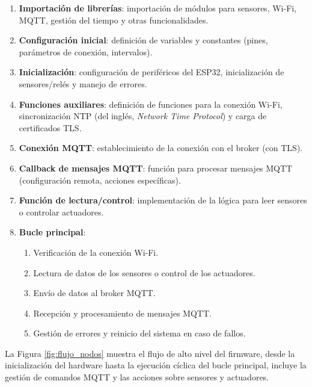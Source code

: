 \begin{enumerate}
    \item \textbf{Importación de librerías}: importación de módulos para sensores,
          Wi-Fi, MQTT, gestión del tiempo y otras funcionalidades.
    \item \textbf{Configuración inicial}: definición de variables y constantes
          (pines, parámetros de conexión, intervalos).
    \item \textbf{Inicialización}: configuración de periféricos del ESP32,
          inicialización de sensores/relés y manejo de errores.
    \item \textbf{Funciones auxiliares}: definición de funciones para la conexión Wi-Fi,
          sincronización NTP (del inglés, \textit{Network Time Protocol}) y carga de
          certificados TLS.
    \item \textbf{Conexión MQTT}: establecimiento de la conexión con el broker (con TLS).
    \item \textbf{Callback de mensajes MQTT}: función para procesar mensajes MQTT
          (configuración remota, acciones específicas).
    \item \textbf{Función de lectura/control}: implementación de la lógica para leer
          sensores o controlar actuadores.
    \item \textbf{Bucle principal}:
          \begin{enumerate}
              \item Verificación de la conexión Wi-Fi.
              \item Lectura de datos de los sensores o control de los actuadores.
              \item Envío de datos al broker MQTT.
              \item Recepción y procesamiento de mensajes MQTT.
              \item Gestión de errores y reinicio del sistema en caso de fallos.
          \end{enumerate}
\end{enumerate}

La Figura \ref{fig:flujo_nodos} muestra el flujo de alto nivel del firmware,
desde la inicialización del hardware hasta la ejecución cíclica del bucle
principal, incluye la gestión de comandos MQTT y las acciones sobre sensores y
actuadores.

